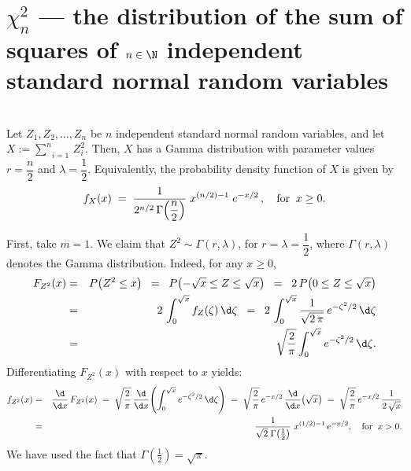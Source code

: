 \documentclass{article}
\begin{document}

\section{$\chi^{2}_{n}$ --- the distribution of the sum of squares of $n\in\N$ independent standard normal random variables}
\setcounter{theorem}{0}

\begin{theorem}\mbox{}\\
Let $Z_{1}, Z_{2}, \ldots, Z_{n}$ be $n$ independent standard normal random variables, and let
$X := \underset{i=1}{\overset{n}{\sum}}\,Z_{i}^{2}$.
Then, $X$ has a Gamma distribution with parameter values $r = \dfrac{n}{2}$ and $\lambda = \dfrac{1}{2}$.
Equivalently, the probability density function of $X$ is given by
\begin{equation*}
f_{X}(x) \; = \; \dfrac{1}{2^{n/2}\,\Gamma\!\left(\dfrac{n}{2}\right)} \; x^{(n/2)-1} \; e^{-x/2}\,,
\quad\textnormal{for}\;\; x \geq 0.
\end{equation*}
\end{theorem}
\proof
First, take $m=1$.  We claim that $Z^{2} \sim \Gamma(r,\lambda)$, for $r = \lambda =\dfrac{1}{2}$,
where $\Gamma(r,\lambda)$ denotes the Gamma distribution.
Indeed, for any $x \geq 0$,
\begin{eqnarray*}
            F_{Z^{2}}(x)
& = &   P\!\left(Z^{2}\leq x\right)
\;\;=\;\;  P\!\left(-\sqrt{x} \leq Z \leq\sqrt{x}\right)
\;\;=\;\; 2\,P\!\left(0 \leq Z \leq\sqrt{x}\right) \\
& = &   2 \, \int_{0}^{\sqrt{x}}f_{Z}(\zeta)\,\d\zeta
\;\;=\;\; 2 \, \int_{0}^{\sqrt{x}}\dfrac{1}{\sqrt{2\,\pi}}\,e^{-\zeta^{2}/2}\,\d\zeta \\
& = &  \sqrt{\dfrac{2}{\pi}} \int_{0}^{\sqrt{x}}e^{-\zeta^{2}/2}\,\d\zeta.
\end{eqnarray*}
Differentiating $F_{Z^{2}}(x)$ with respect to $x$ yields:
\begin{eqnarray*}
       f_{Z^{2}}(x)
&=& \dfrac{\d}{\d x}\,F_{Z^{2}}(x)
\;=\; \sqrt{\dfrac{2}{\pi}}\,\dfrac{\d}{\d x}\!\left(\int_{0}^{\sqrt{x}}e^{-\zeta^{2}/2}\,\d\zeta\right)
\;=\; \sqrt{\dfrac{2}{\pi}}\,e^{-x/2}\,\dfrac{\d}{\d x}\!\left(\sqrt{x}\right)
\;=\; \sqrt{\dfrac{2}{\pi}}\,e^{-x/2}\,\dfrac{1}{2\,\sqrt{x}} \\
&=& \dfrac{1}{\sqrt{2}\;\Gamma\!\left(\frac{1}{2}\right)}\;x^{(1/2)-1}\,e^{-x/2},
       \quad\textnormal{for}\;\; x > 0.
\end{eqnarray*}
We have used the fact that $\Gamma\!\left(\frac{1}{2}\right) = \sqrt{\pi}$.
\end{document}
